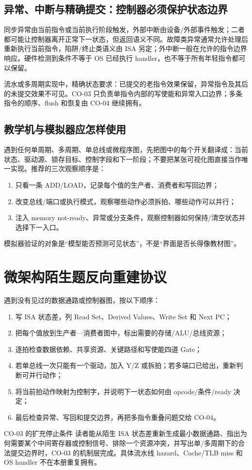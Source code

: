 \documentclass[UTF8,fontset=fandol,11pt,a4paper]{ctexart}
\begin{document}
\subsection{异常、中断与精确提交：控制器必须保护状态边界}

同步异常由当前指令或当前执行阶段触发，外部中断由设备/外部事件触发；二者都可能让控制器离开正常下一状态，但返回语义不同。故障类异常通常允许处理后重新执行当前指令，陷阱/终止类语义由 ISA 另定；外中断一般在允许的指令边界响应。硬件检测到条件不等于 OS 已经执行 handler，也不等于所有年轻指令都可以保留。

流水或多周期实现中，精确状态要求：已提交的老指令效果保留，异常指令及其后的未提交效果不可见。CO-03 只负责单指令内部的写使能和异常入口边界；多条指令的顺序、flush 和恢复由 CO-04 继续拥有。

\subsection{教学机与模拟器应怎样使用}

遇到任何单周期、多周期、单总线或微程序图，先把图中的每个开关翻译成：当前状态、驱动源、锁存目标、控制字段和下一阶段；不要把某张可视化图直接当作唯一实现。推荐的三次观察顺序是：
\begin{enumerate}
  \item 只看一条 ADD/LOAD，记录每个值的生产者、消费者和写回边界；
  \item 改变总线/端口或执行模式，观察哪些动作必须拆拍、哪些动作可以并行；
  \item 注入 memory not-ready、异常或分支条件，观察控制器如何保持/清空状态并选择下一入口。
\end{enumerate}
模拟器验证的对象是“模型能否预测可见状态”，不是“界面是否长得像教材图”。

\section{微架构陌生题反向重建协议}

遇到没有见过的数据通路或控制器图，按以下顺序：
\begin{enumerate}
  \item 写 ISA 状态差，列 Read Set、Derived Values、Write Set 和 Next PC；
  \item 把每个值放到生产者—消费者图中，标出需要的存储/ALU/总线资源；
  \item 逐拍检查数据依赖、共享资源、关键路径和写使能四道 Gate；
  \item 若单总线一次只能有一个驱动，加入 Y/Z 或拆拍；若多端口已给出，重新判断可并行动作；
  \item 将当前拍动作映射为控制字，并说明下一状态如何由 opcode/条件/ready 决定；
  \item 最后检查异常、写回和提交边界，再把多指令重叠问题交给 CO-04。
\end{enumerate}

\begin{methodbox}{CO-03 的扩充停止条件}
读者能从陌生 ISA 状态差重新生成最小数据通路、指出为何需要某个中间寄存器或控制信号、排除一个资源冲突，并写出单/多周期下的合法提交边界时，CO-03 的机制层完成。具体流水线 hazard、Cache/TLB miss 和 OS handler 不在本册重复拥有。
\end{methodbox}
\end{document}
